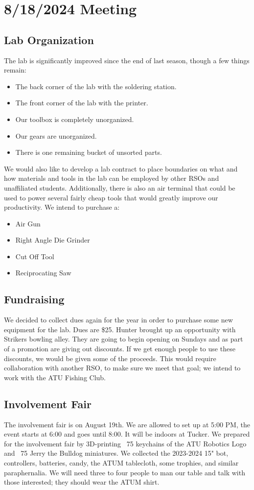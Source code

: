 
\section{8/18/2024 Meeting}
\subsection{Lab Organization}
The lab is significantly improved since the end of last season, though a few
things remain:
\begin{itemize}
    \item The back corner of the lab with the soldering station.
    \item The front corner of the lab with the printer.
    \item Our toolbox is completely unorganized.
    \item Our gears are unorganized.
    \item There is one remaining bucket of unsorted parts.
\end{itemize}

We would also like to develop a lab contract to place boundaries on what and how
materials and tools in the lab can be employed by other RSOs and unaffiliated
students. Additionally, there is also an air terminal that could be used to
power several fairly cheap tools that would greatly improve our productivity. We
intend to purchase a:
\begin{itemize}
    \item Air Gun
    \item Right Angle Die Grinder
    \item Cut Off Tool
    \item Reciprocating Saw
\end{itemize}

\subsection{Fundraising}
We decided to collect dues again for the year in order to purchase some new
equipment for the lab. Dues are \$25. Hunter brought up an opportunity with
Strikers bowling alley. They are going to begin opening on Sundays and as part
of a promotion are giving out discounts. If we get enough people to use these
discounts, we would be given some of the proceeds. This would require
collaboration with another RSO, to make sure we meet that goal; we intend to
work with the ATU Fishing Club.

\subsection{Involvement Fair}
The involvement fair is on August 19th. We are allowed to set up at 5:00 PM, the
event starts at 6:00 and goes until 8:00. It will be indoors at Tucker. We
prepared for the involvement fair by 3D-printing ~75 keychains of the ATU
Robotics Logo and ~75 Jerry the Bulldog miniatures. We collected the 2023-2024
15" bot, controllers, batteries, candy, the ATUM tablecloth, some trophies, and
similar paraphernalia. We will need three to four people to man our table and
talk with those interested; they should wear the ATUM shirt.

